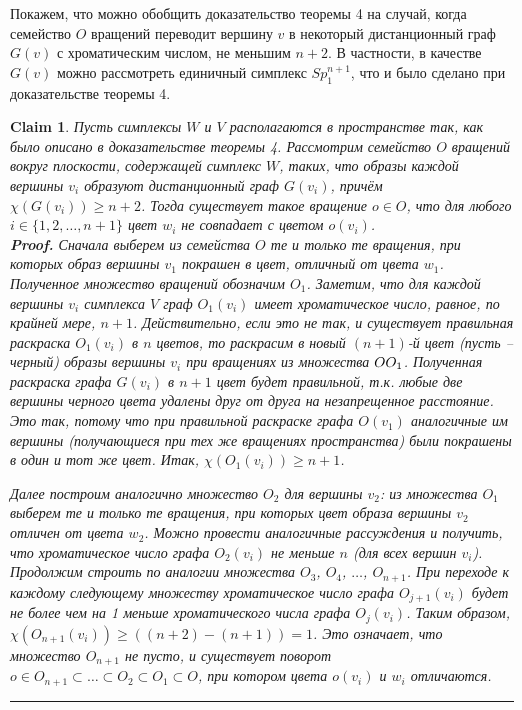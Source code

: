 \documentclass{report}%
\newtheorem{claim}[theorem]{Claim}
\newenvironment{proof}[1][Proof]{\textbf{#1.} }{\ \rule{0.5em}{0.5em}}
\begin{document}
Покажем, что можно обобщить доказательство теоремы 4 на случай, 
когда семейство $O$ вращений переводит вершину $v$ в некоторый дистанционный граф $G(v)$ 
с хроматическим числом, не меньшим $n + 2$. В частности, в качестве $G(v)$ 
можно рассмотреть единичный симплекс $Sp_1^{n+1}$, что и было сделано при доказательстве теоремы 4.

\begin{claim}
		Пусть симплексы $W$ и $V$ располагаются в пространстве так, как было описано в доказательстве теоремы 4.
		Рассмотрим семейство $O$ вращений вокруг плоскости, содержащей симплекс $W$, таких,
		что образы каждой вершины $v_i$ образуют дистанционный граф $G(v_i)$, причём $\chi(G(v_i)) \geq n+2$.
		Тогда существует такое вращение $o \in O$, что для любого $i \in \{1, 2, \ldots, n + 1\}$ цвет $w_i$ не совпадает с цветом $o(v_i)$. \\
		\begin{proof}
				Сначала выберем из семейства $O$ те и только те вращения, при которых образ вершины $v_1$ покрашен в цвет,
				отличный от цвета $w_1$. Полученное множество вращений обозначим $O_1$.
				Заметим, что для каждой вершины $v_i$ симплекса $V$ граф $O_1(v_i)$ имеет хроматическое число, равное, по крайней мере, $n+1$.
				Действительно, если это не так, и существует правильная раскраска $O_1(v_i)$ в $n$ цветов,
				то раскрасим в новый $(n+1)$-й цвет (пусть – черный) образы вершины $v_i$ при вращениях из множества $O \\ O_1$.
				Полученная раскраска графа $G(v_i)$ в $n+1$ цвет будет правильной,
				т.к. любые две вершины черного цвета удалены друг от друга на незапрещенное расстояние.
				Это так, потому что при правильной раскраске графа $O(v_1)$ аналогичные им вершины (получающиеся при тех же вращениях пространства)
				были покрашены в один и тот же цвет. Итак, $\chi(O_1(v_i)) \geq n+1$.
				
				Далее построим аналогично множество $O_2$ для вершины $v_2$: из множества $O_1$ выберем те и только те вращения,
				при которых цвет образа вершины $v_2$ отличен от цвета $w_2$. Можно провести аналогичные рассуждения и получить,
				что хроматическое число графа $O_2(v_i)$ не меньше $n$ (для всех вершин $v_i$).
				Продолжим строить по аналогии множества $O_3$, $O_4$, $\ldots$, $O_{n+1}$.
				При переходе к каждому следующему множеству хроматическое число графа $O_{j+1}(v_i)$
				будет не более чем на 1 меньше хроматического числа графа $O_j(v_i)$.
				Таким образом, $\chi(O_{n+1}(v_i)) \geq ((n+2)-(n+1)) = 1$. Это означает, что множество $O_{n+1}$ не пусто,
				и существует поворот $o \in O_{n+1} \subset \ldots \subset O_2 \subset O_1 \subset O$, при котором цвета $o(v_i)$ и $w_i$ отличаются. 
		\end{proof}
\end{claim}
\end{document}
